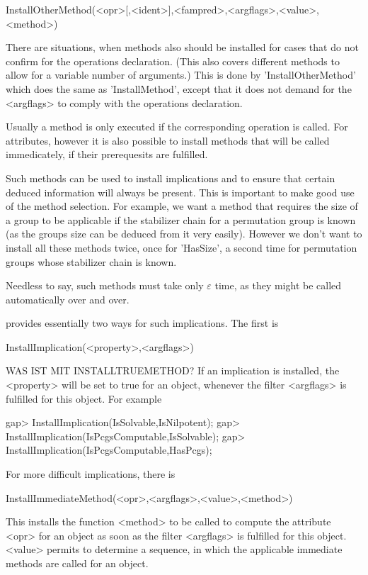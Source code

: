 \>InstallOtherMethod(<opr>[,<ident>],<fampred>,<argflags>,<value>,<method>)

There are situations, when methods also should be installed for cases that
do not confirm for the operations declaration. (This also covers different
methods to allow for a variable number of arguments.) This is done by
'InstallOtherMethod'
which does the same as 'InstallMethod', except that it does not demand for the
<argflags> to comply with the operations declaration.


Usually a method is only executed if the corresponding operation is called.
For attributes, however it is also possible to install methods that will be
called immedicately, if their prerequesits are fulfilled.

Such methods can be used to install implications and to ensure that certain
deduced information will always be present. This is important to make
good use of the method selection. For example, we want a method that
requires the size of a group to be applicable if the stabilizer chain for a
permutation group is known (as the groups size can be deduced from it very
easily). However we don't want to install all these methods twice, once for
'HasSize', a second time for permutation groups whose stabilizer chain is
known.

Needless to say, such methods must take only $\varepsilon$ time, as they
might be called automatically over and over. 

{\GAP} provides essentially two ways for such implications. The first is

\>InstallImplication(<property>,<argflags>)

WAS IST MIT INSTALLTRUEMETHOD?
If an implication is installed, the <property> will be set to true for an
object, whenever the filter <argflags> is fulfilled for this object.
For example

\beginexample
gap> InstallImplication(IsSolvable,IsNilpotent);
gap> InstallImplication(IsPcgsComputable,IsSolvable);
gap> InstallImplication(IsPcgsComputable,HasPcgs);
\endexample

For more difficult implications, there is

\>InstallImmediateMethod(<opr>,<argflags>,<value>,<method>)

This installs the function <method> to be called to compute the attribute
<opr> for an object as soon as the filter <argflags> is fulfilled for this
object. <value> permits to determine a sequence, in which the applicable
immediate methods are called for an object.


